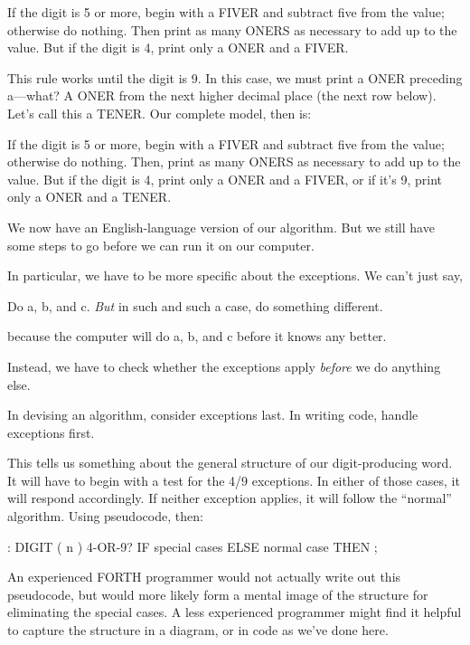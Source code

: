 \begin{tfquot}
If the digit is 5 or more, begin with a FIVER and subtract five from the
value; otherwise do nothing. Then print as many ONERS as necessary to
add up to the value. But if the digit is 4, print only a ONER and a FIVER.
\end{tfquot}
This rule works until the digit is 9. In this case, we must print a ONER
preceding a---what? A ONER from the next higher decimal place (the
next row below). Let's call this a TENER. Our complete model, then is:

\begin{tfquot}
If the digit is 5 or more, begin with a FIVER and subtract five from the
value; otherwise do nothing. Then, print as many ONERS as necessary to
add up to the value. But if the digit is 4, print only a ONER and a FIVER,
or if it's 9, print only a ONER and a TENER.
\end{tfquot}
We now have an English-language version of our algorithm. But we still
have some steps to go before we can run it on our computer.

In particular, we have to be more specific about the exceptions. We
can't just say,

\begin{tfquot}
Do a, b, and c. \emph{But} in such and such a case, do something different.
\end{tfquot}
because the computer will do a, b, and c before it knows any better.

Instead, we have to check whether the exceptions apply \emph{before} we
do anything else.

\begin{tip}
In devising an algorithm, consider exceptions last. In writing code, handle
exceptions first.
\end{tip}
This tells us something about the general structure of our digit-producing
word. It will have to begin with a test for the 4/9 exceptions. In
either of those cases, it will respond accordingly. If neither exception
applies, it will follow the ``normal'' algorithm. Using pseudocode, then:

\begin{Code}
: DIGIT  ( n )  4-OR-9? IF  special cases
   ELSE  normal case  THEN ;
\end{Code}

An experienced FORTH programmer would not actually write out this
pseudocode, but would more likely form a mental image of the structure
for eliminating the special cases. A less experienced programmer might
find it helpful to capture the structure in a diagram, or in code as we've
done here.

